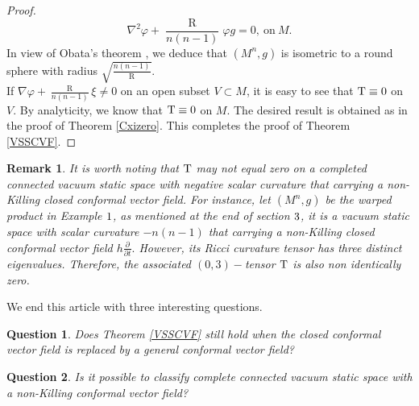 \documentclass[10pt,leqno,oneside]{amsart}
\newtheorem{Rmk}{Remark}
\newtheorem{Que}{Question}
\begin{document}
{\begin{proof}
       \[\nabla^2\varphi+\frac{\operatorname R}{n(n-1)}\varphi g=0,~\text{on}~ M.\]
       In view of Obata's theorem \cite[Theorem A]{Obata1962}, we deduce that $(M^n, g)$ is isometric to a round sphere with radius $\sqrt{\frac{n(n-1)}{\operatorname R}}.$ \\
       If $\nabla\varphi+\frac{\operatorname R}{n(n-1)}\xi\neq0$ on an open subset $V\subset M$, it is easy to see that ${\rm T}\equiv0$ on $V.$ By analyticity, we know that ${\rm T}\equiv0$ on $M.$ The desired result is obtained as in the proof of Theorem \ref{Cxizero}. This completes the proof of Theorem \ref{VSSCVF}.
    \end{proof}

   \begin{Rmk}
       It is worth noting that ${\rm T}$ may not equal zero on a completed connected vacuum static space with negative scalar curvature that carrying a non-Killing closed conformal vector field. For instance, let $(M^n, g)$ be the warped product in Example ${\rm 1}$, as mentioned at the end of section ${\rm 3}$, it is a vacuum static space with scalar curvature $-n(n-1)$ that carrying a non-Killing closed conformal vector field $h\frac{\partial}{\partial t}.$ However, its Ricci curvature tensor has three distinct eigenvalues. Therefore, the associated $(0,3)-$tensor ${\rm T}$ is also non identically zero.
   \end{Rmk}

       We end this article with three interesting questions.
   \begin{Que}
       Does Theorem {\rm\ref{VSSCVF}} still hold when the closed conformal vector field is replaced by a general conformal vector field?
   \end{Que}
   \begin{Que}
       Is it possible to classify complete connected vacuum static space with a non-Killing conformal vector field?
   \end{Que}


}
\end{document}
